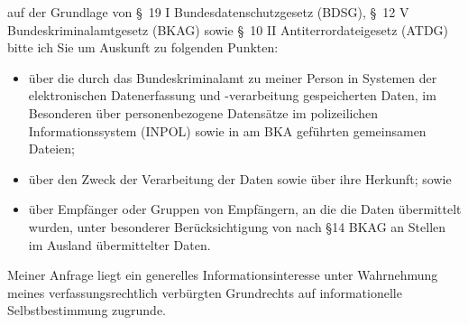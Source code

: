 auf der Grundlage von §~19 I Bundesdatenschutzgesetz (BDSG),
§~12 V Bundeskriminalamtgesetz (BKAG) sowie §~10 II Antiterrordateigesetz (ATDG)
bitte ich Sie um Auskunft zu folgenden Punkten:

\begin{itemize}
  \item über die durch das Bundeskriminalamt zu meiner Person in Systemen der
  elektronischen Datenerfassung und -verarbeitung gespeicherten Daten, im
  Besonderen über personenbezogene Datensätze im polizeilichen Informationssystem
  (INPOL) sowie in am BKA geführten gemeinsamen Dateien;

  \item über den Zweck der Verarbeitung der Daten sowie über ihre Herkunft; sowie

  \item über Empfänger oder Gruppen von Empfängern, an die die Daten übermittelt
  wurden, unter besonderer Berücksichtigung von nach §14 BKAG an Stellen im
  Ausland übermittelter Daten.
\end{itemize}

Meiner Anfrage liegt ein generelles Informationsinteresse unter Wahrnehmung
meines verfassungsrechtlich verbürgten Grundrechts auf informationelle
Selbstbestimmung zugrunde.
